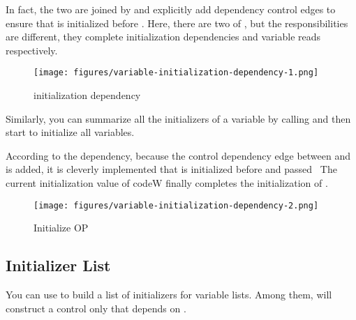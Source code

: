 \begin{content}

In fact, the two are joined by  and explicitly add dependency control edges to ensure that  is initialized before . Here, there are two  of , but the responsibilities are different, they complete initialization dependencies and variable reads respectively.


\begin{figure}[!h]
\centering
\texttt{[image: figures/variable-initialization-dependency-1.png]}
\caption{initialization dependency}
 \label{fig:variable-initialization-dependency-1}
\end{figure}

Similarly, you can summarize all the initializers of a variable by calling  and then start  to initialize all variables.


According to the dependency, because the control dependency edge between  and  is added, it is cleverly implemented that  is initialized before  and passed \ The current initialization value of code{W} finally completes the initialization of .

\begin{figure}[!h]
\centering
\texttt{[image: figures/variable-initialization-dependency-2.png]}
\caption{Initialize OP}
 \label{fig:variable-initialization-dependency-2}
\end{figure}

\subsection{Initializer List}

You can use  to build a list of initializers for variable lists. Among them,  will construct a control only  that depends on .


\end{content}
